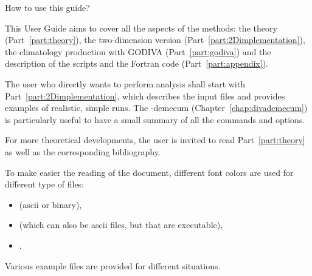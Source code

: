 \begin{center}
\begin{minipage}[c]{.85\textwidth}
\end{minipage}

\end{center}

\vspace*{\fill}

\newpage

\vspace*{\fill}

\begin{center}
\begin{minipage}[c]{.85\textwidth}
\Large{How to use this guide?}
\vspace{1cm}
\normalsize

This \diva User Guide aims to cover all the aspects of the methods: the theory (Part~\ref{part:theory}), the two-dimension version (Part~\ref{part:2Dimplementation}), the climatology production with GODIVA (Part~\ref{part:godiva}) and the description of the scripts and the Fortran code (Part~\ref{part:appendix}). 

The user who directly wants to perform analysis shall start with Part~\ref{part:2Dimplementation}, which describes the input files and provides examples of realistic, simple runs. The \diva-demecum (Chapter~\ref{chap:divademecum}) is particularly useful to have a small summary of all the commands and options.

For more theoretical developments, the user is invited to read Part~\ref{part:theory} as well as the corresponding bibliography.

To make easier the reading of the document, different font colors are used for different type of files:
\begin{itemize}
\item {} (ascii or binary),
\item {} (which can also be ascii files, but that are executable),
\item {}.
\end{itemize}
Various example files are provided for different situations. 


\vspace{.25cm}
\end{minipage}

\end{center}

\vspace*{\fill}

